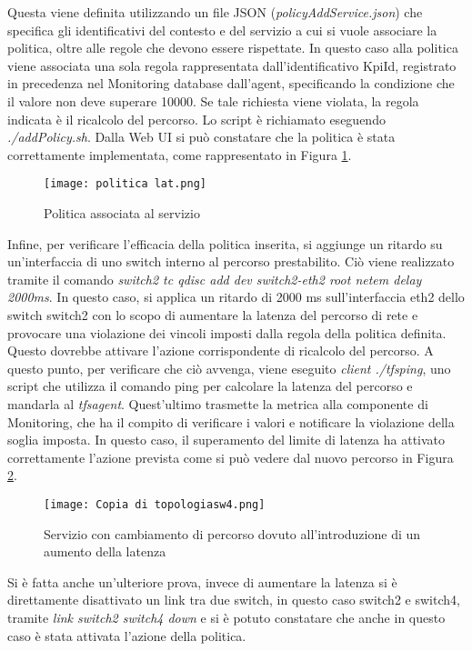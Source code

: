 Questa viene definita utilizzando un file JSON (\textit{policyAddService.json}) che specifica gli identificativi 
del contesto e del servizio a cui si vuole associare la politica, oltre alle regole che devono essere rispettate. 
In questo caso 
alla politica viene associata una sola regola rappresentata dall'identificativo KpiId, registrato in precedenza nel Monitoring database dall'agent, 
specificando la condizione che il valore non deve superare 10000.
Se tale richiesta viene violata, la regola indicata è il ricalcolo del percorso.
Lo script è richiamato eseguendo \textit{./addPolicy.sh}.
Dalla Web UI si può constatare che la politica è stata correttamente implementata, come rappresentato in Figura \ref{fig:lat}.
\begin{figure}[h]
    \centering
    \texttt{[image: politica lat.png]}
    \caption{Politica associata al servizio}
    \label{fig:lat}
\end{figure}
Infine, per verificare l'efficacia della politica inserita, si aggiunge un ritardo su un'interfaccia di uno switch interno al percorso prestabilito.
Ciò viene realizzato tramite il comando
\textit{switch2 tc qdisc add dev switch2-eth2 root netem delay 2000ms}. 
In questo caso, si applica un ritardo di 2000 ms sull'interfaccia eth2 dello switch switch2 con lo scopo di aumentare la latenza del percorso di rete
e provocare una violazione dei vincoli imposti dalla regola della politica definita.
Questo dovrebbe attivare l'azione corrispondente di ricalcolo del percorso.
A questo punto, per verificare che ciò avvenga, viene eseguito \textit{client ./tfsping}, uno script che utilizza il comando ping per calcolare la latenza del percorso e mandarla al \textit{tfsagent}.
Quest'ultimo trasmette la metrica alla componente di Monitoring, che ha il compito di verificare i valori e notificare la violazione della soglia imposta. 
In questo caso, il superamento del limite di latenza ha attivato correttamente l'azione prevista come si può vedere dal nuovo percorso in Figura \ref{fig:sw4 dopo}.
\begin{figure}[h]
    \centering
    \texttt{[image: Copia di topologiasw4.png]}
    \caption{Servizio con cambiamento di percorso dovuto all'introduzione di un aumento della latenza}
    \label{fig:sw4 dopo}
\end{figure}
Si è fatta anche un'ulteriore prova, invece di aumentare la latenza si è direttamente disattivato un link tra due switch, 
in questo caso switch2 e switch4, tramite \textit{link switch2 switch4 down} e si è potuto constatare che anche in questo caso è stata attivata l’azione della politica.
